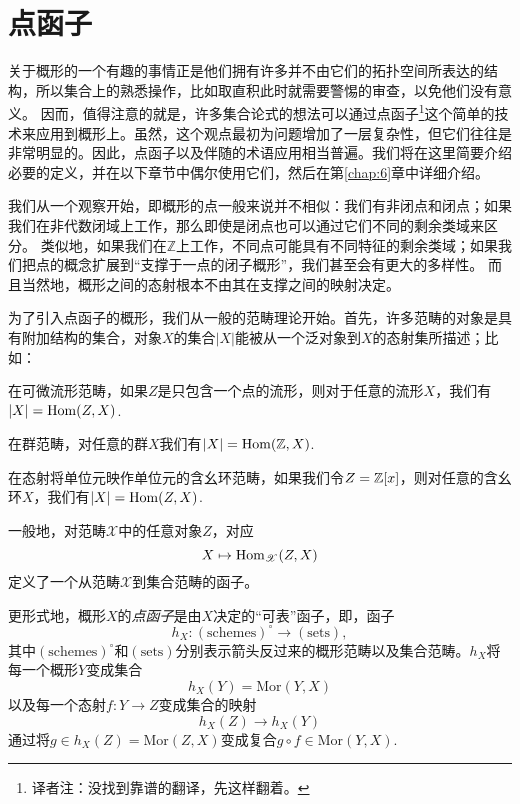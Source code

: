 \section{点函子}

关于概形的一个有趣的事情正是他们拥有许多并不由它们的拓扑空间所表达的结构，所以集合上的熟悉操作，比如取直积此时就需要警惕的审查，以免他们没有意义。 因而，值得注意的就是，许多集合论式的想法可以通过点函子\footnote{译者注：没找到靠谱的翻译，先这样翻着。}这个简单的技术来应用到概形上。虽然，这个观点最初为问题增加了一层复杂性，但它们往往是非常明显的。因此，点函子以及伴随的术语应用相当普遍。我们将在这里简要介绍必要的定义，并在以下章节中偶尔使用它们，然后在第\ref{chap:6}章中详细介绍。

我们从一个观察开始，即概形的点一般来说并不相似：我们有非闭点和闭点；如果我们在非代数闭域上工作，那么即使是闭点也可以通过它们不同的剩余类域来区分。 类似地，如果我们在$\mathbb{Z}$上工作，不同点可能具有不同特征的剩余类域；如果我们把点的概念扩展到“支撑于一点的闭子概形”，我们甚至会有更大的多样性。 而且当然地，概形之间的态射根本不由其在支撑之间的映射决定。


为了引入点函子的概形，我们从一般的范畴理论开始。首先，许多范畴的对象是具有附加结构的集合，对象$X$的集合$|X|$能被从一个泛对象到$X$的态射集所描述；比如：
\begin{compactenum}[(a)]
\item 在可微流形范畴，如果$Z$是只包含一个点的流形，则对于任意的流形$X$，我们有$|X|=\operatorname{Hom}(Z,X)$.
\item 在群范畴，对任意的群$X$我们有$|X|=\operatorname{Hom}(\mathbb{Z},X)$.
\item 在态射将单位元映作单位元的含幺环范畴，如果我们令$Z=\mathbb{Z}[x]$，则对任意的含幺环$X$，我们有$|X|=\operatorname{Hom}(Z,X)$.
\end{compactenum}

一般地，对范畴$\mathscr{X}$中的任意对象$Z$，对应
\[
	X\mapsto \operatorname{Hom}_{\mathscr{X}}(Z,X)
\]
定义了一个从范畴$\mathscr{X}$到集合范畴的函子。

更形式地，概形$X$的\textit{点函子}是由$X$决定的“可表”函子，即，函子
\[
	h_X:(\text{schemes})^\circ\to (\text{sets}),
\]
其中$(\text{schemes})^\circ$和$(\text{sets})$分别表示箭头反过来的概形范畴以及集合范畴。$h_X$将每一个概形$Y$变成集合
\[
	h_X(Y)=\mathrm{Mor}(Y,X)
\]
以及每一个态射$f:Y\to Z$变成集合的映射
\[
	h_X(Z)\to h_X(Y)
\]
通过将$g\in h_X(Z)=\mathrm{Mor}(Z,X)$变成复合$g\circ f\in \mathrm{Mor}(Y,X)$.